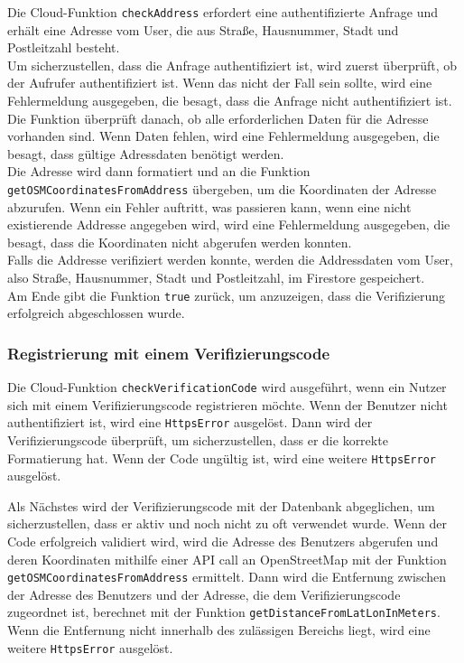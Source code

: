 Die Cloud-Funktion \texttt{checkAddress} erfordert eine authentifizierte Anfrage und erhält eine Adresse vom User, die aus Straße, Hausnummer, Stadt und Postleitzahl besteht.
\\
Um sicherzustellen, dass die Anfrage authentifiziert ist, wird zuerst überprüft, ob der Aufrufer authentifiziert ist. Wenn das nicht der Fall sein sollte, wird eine Fehlermeldung ausgegeben, die besagt, dass die Anfrage nicht authentifiziert ist.
\\
Die Funktion überprüft danach, ob alle erforderlichen Daten für die Adresse vorhanden sind. Wenn Daten fehlen, wird eine Fehlermeldung ausgegeben, die besagt, dass gültige Adressdaten benötigt werden.
\\
Die Adresse wird dann formatiert und an die Funktion \texttt{getOSMCoordinatesFromAddress} übergeben, um die Koordinaten der Adresse abzurufen. Wenn ein Fehler auftritt, was passieren kann, wenn eine nicht existierende Addresse angegeben wird, wird eine Fehlermeldung ausgegeben, die besagt, dass die Koordinaten nicht abgerufen werden konnten.
\\
Falls die Addresse verifiziert werden konnte, werden die Addressdaten vom User, also Straße, Hausnummer, Stadt und Postleitzahl, im Firestore gespeichert.
\\
Am Ende gibt die Funktion \texttt{true} zurück, um anzuzeigen, dass die Verifizierung erfolgreich abgeschlossen wurde.

\subsubsection{Registrierung mit einem Verifizierungscode}\label{subsec:registrierung-verify}

Die Cloud-Funktion \texttt{checkVerificationCode} wird ausgeführt, wenn ein Nutzer sich mit einem Verifizierungscode registrieren möchte. Wenn der Benutzer nicht authentifiziert ist, wird eine \texttt{HttpsError} ausgelöst. Dann wird der Verifizierungscode überprüft, um sicherzustellen, dass er die korrekte Formatierung hat. Wenn der Code ungültig ist, wird eine weitere \texttt{HttpsError} ausgelöst.

Als Nächstes wird der Verifizierungscode mit der Datenbank abgeglichen, um sicherzustellen, dass er aktiv und noch nicht zu oft verwendet wurde. Wenn der Code erfolgreich validiert wird, wird die Adresse des Benutzers abgerufen und deren Koordinaten mithilfe einer API call an OpenStreetMap mit der Funktion \texttt{getOSMCoordinatesFromAddress} ermittelt. Dann wird die Entfernung zwischen der Adresse des Benutzers und der Adresse, die dem Verifizierungscode zugeordnet ist, berechnet mit der Funktion \texttt{getDistanceFromLatLonInMeters}. Wenn die Entfernung nicht innerhalb des zulässigen Bereichs liegt, wird eine weitere \texttt{HttpsError} ausgelöst.

